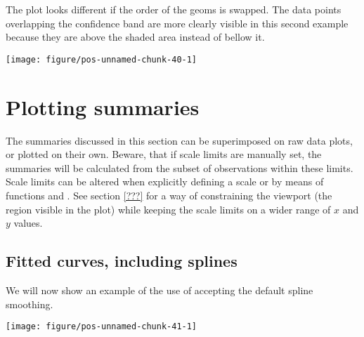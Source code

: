 \documentclass[paper=a4,headsepline,BCOR=12mm,twoside,open=right,%
titlepage,headings=small,fontsize=10pt,index=totoc,bibliography=totoc,%
captions=tableheading,captions=nooneline]{scrbook}\usepackage{knitr}
\begin{document}
The plot looks different if the order of the geoms is swapped. The data points overlapping the confidence band are more clearly visible in this second example because they are above the shaded area instead of bellow it.

\begin{knitrout}\footnotesize
{}\color{fgcolor}\begin{kframe}
\begin{alltt}
\hlstd{(}  \hlstd{(}  \hlstd{=} \hlopt{+}
   \hlstd{(}\hlstd{=}\hlstd{,} \hlstd{=}\hlstd{)} \hlopt{+} \hlstd{()}
\end{alltt}
\end{kframe}

{\centering \texttt{[image: figure/pos-unnamed-chunk-40-1]} 

}



\end{knitrout}

\section{Plotting summaries}

The summaries discussed in this section can be superimposed on raw data plots, or plotted on their own. Beware, that if scale limits are manually set, the summaries will be calculated from the subset of observations within these limits. Scale limits can be altered when explicitly defining a scale or by means of functions  and . See section \ref{???} for a way of constraining the viewport (the region visible in the plot) while keeping the scale limits on a wider range of $x$ and $y$ values.

\subsection{Fitted curves, including splines}

We will now show an example of the use of  accepting the default spline smoothing.

\begin{knitrout}\footnotesize
{}\color{fgcolor}\begin{kframe}
\begin{alltt}
 \hlopt{+} \hlstd{(}\hlstd{=}\hlstd{)}
\end{alltt}
\end{kframe}

{\centering \texttt{[image: figure/pos-unnamed-chunk-41-1]} 

}



\end{knitrout}
\end{document}
